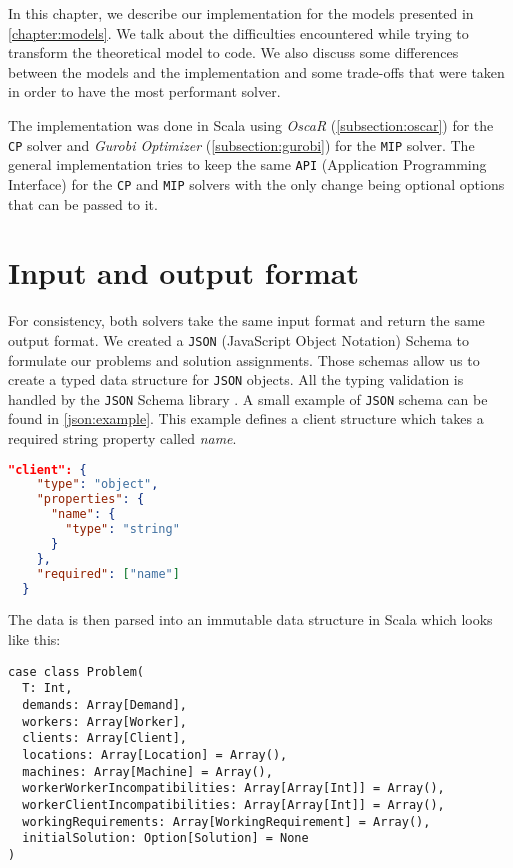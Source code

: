 \documentclass[../thesis.tex]{subfiles}
\begin{document}
In this chapter, we describe our implementation for the models presented in \autoref{chapter:models}. 
We talk about the difficulties encountered while trying to transform the theoretical model to code. 
We also discuss some differences between the models and the implementation and some trade-offs that were taken in order to 
have the most performant solver.

The implementation was done in Scala using 
\emph{OscaR} (\ref{subsection:oscar}) for the \texttt{CP} solver and
\emph{Gurobi Optimizer} (\ref{subsection:gurobi}) for the \texttt{MIP} solver. The general implementation 
tries to keep the same \texttt{API} (Application Programming Interface) for the \texttt{CP} and \texttt{MIP} solvers with the only change being optional options 
that can be passed to it. 



\section{Input and output format}

For consistency, both solvers take the same input format and return the same output format.
We created a \texttt{JSON} (JavaScript Object Notation) Schema \cite{json:schema} to formulate our problems and solution assignments.
Those schemas allow us to create a typed data structure for \texttt{JSON} objects. All the typing validation 
is handled by the \texttt{JSON} Schema library \cite{playjson:validator}. A small example of \texttt{JSON} schema can be found in \autoref{json:example}. 
This example defines a client structure which takes a required string property called \textit{name}.


\begin{lstlisting}[language=json,firstnumber=1,caption={\texttt{JSON} Schema example},captionpos=b,label={json:example}]
  "client": {
    "type": "object",
    "properties": {
      "name": {
        "type": "string"
      }
    },
    "required": ["name"]
  }
\end{lstlisting}

The data is then parsed into an immutable data structure in Scala which looks like this:

\begin{lstlisting}[style=scalaStyle,caption={Problem structure in Scala},captionpos=b]
case class Problem(
  T: Int,
  demands: Array[Demand],
  workers: Array[Worker],
  clients: Array[Client],
  locations: Array[Location] = Array(),
  machines: Array[Machine] = Array(),
  workerWorkerIncompatibilities: Array[Array[Int]] = Array(),
  workerClientIncompatibilities: Array[Array[Int]] = Array(),
  workingRequirements: Array[WorkingRequirement] = Array(),
  initialSolution: Option[Solution] = None
)
\end{lstlisting}
\end{document}
